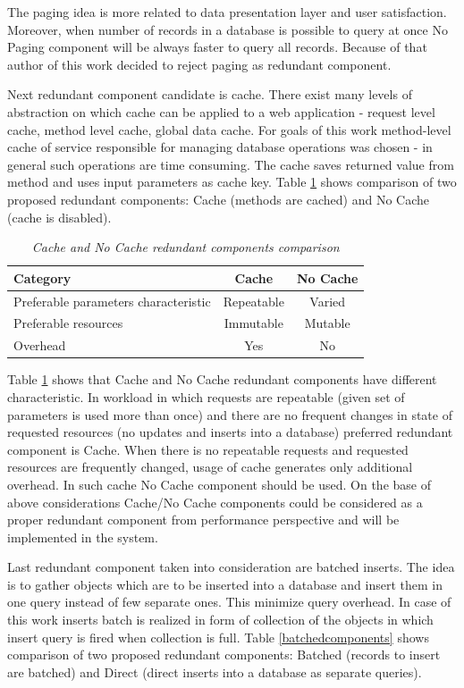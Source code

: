\documentclass[12pt,a4paper]{article}
\begin{document}
The paging idea is more related to data presentation layer and user satisfaction. Moreover, when number of records in a database is possible to query at once No Paging component will be always faster to query all records. Because of that author of this work decided to reject paging as redundant component. 

Next redundant component candidate is cache. There exist many levels of abstraction on which cache can be applied to a web application - request level cache, method level cache, global data cache. For goals of this work method-level cache of service responsible for managing database operations was chosen - in general such operations are time consuming. The cache saves returned value from method and uses input parameters as cache key. Table \ref{cachecomponents} shows comparison of two proposed redundant components: Cache (methods are cached) and No Cache (cache is disabled).
\begin{table}[!htb]
\begin{center}
\begin{tabular}{l|c|c}
  \textbf{Category} &\textbf{Cache} & \textbf{No Cache} \\
\hline
Preferable parameters characteristic & Repeatable & Varied \\
Preferable resources & Immutable & Mutable\\
Overhead & Yes & No\\
\end{tabular}
\end{center}
\caption{\textit{Cache and No Cache redundant components comparison}}\label{cachecomponents}
\end{table}
 
Table \ref{cachecomponents} shows that Cache and No Cache redundant components have different characteristic. In workload in which requests are repeatable (given set of parameters is used more than once) and there are no frequent changes in state of requested resources (no updates and inserts into a database) preferred redundant component is Cache. When there is no repeatable requests and requested resources are frequently changed, usage of cache generates only additional overhead. In such cache No Cache component should be used. On the base of above considerations Cache/No Cache components could be considered as a proper redundant component from performance perspective and will be implemented in the system. 

Last redundant component taken into consideration are batched inserts. The idea is to gather objects which are to be inserted into a database and insert them in one query instead of few separate ones. This minimize query overhead. In case of this work inserts batch is realized in form of collection of the objects in which insert query is fired when collection is full.   
Table \ref{batchedcomponents} shows comparison of two proposed redundant components: Batched (records to insert are batched) and Direct (direct inserts into a database as separate queries).
\end{document}
